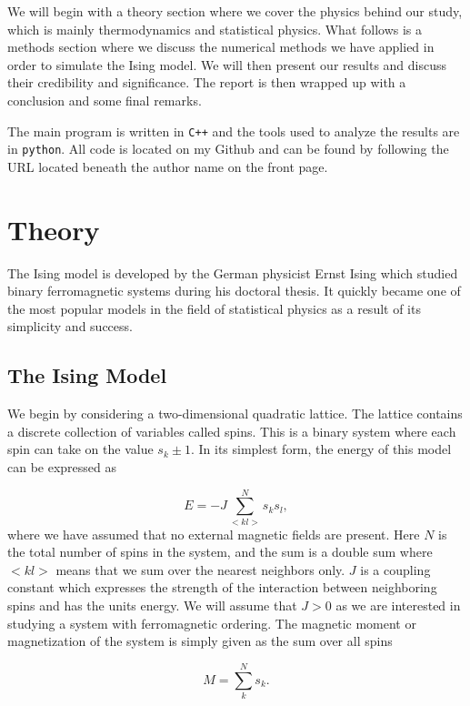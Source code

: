 \documentclass[a4paper, 10pt, reqno]{amsart}
\begin{document}
We will begin with a theory section where we cover the physics behind
our study, which is mainly thermodynamics and statistical physics. What
follows is a methods section where we discuss the numerical methods we
have applied in order to simulate the Ising model. We will then present
our results and discuss their credibility and significance. The report is then wrapped up with a conclusion and some final remarks.

The main program is written in \texttt{C++} and the tools used to analyze
the results are in \texttt{python}. All code is located on my Github and can be found by following the URL located beneath the author name on the front page.

\newpage 

\section{Theory}

The Ising model is developed by the German physicist Ernst Ising which studied binary ferromagnetic systems during his doctoral thesis. It quickly became one of the most popular models in the field of statistical physics as a result of its simplicity and success.

\subsection{The Ising Model}We begin by considering a two-dimensional
quadratic lattice. The lattice contains a discrete collection of variables called
spins. This is a binary system where each spin can take on the value $s_k
\pm 1$. In its simplest form, the energy of this model can be expressed as


\begin{equation}\label{eq:energy}
    E = -J \sum_{< kl >}^N s_k s_l,
\end{equation}
where we have assumed that no external magnetic fields are present. Here
$N$ is the total number of spins in the system, and the sum is a double sum
where $<kl>$ means that we sum over the nearest neighbors only. $J$ is a
coupling constant which expresses the strength of the interaction between
neighboring spins and has the units energy. We will assume that $J > 0$ as we are interested in studying a system with ferromagnetic ordering. The magnetic moment or magnetization of the system is simply given as the sum over all spins

\begin{equation}\label{eq:magnetism}
    M = \sum_k^N s_k.
\end{equation}
\end{document}
